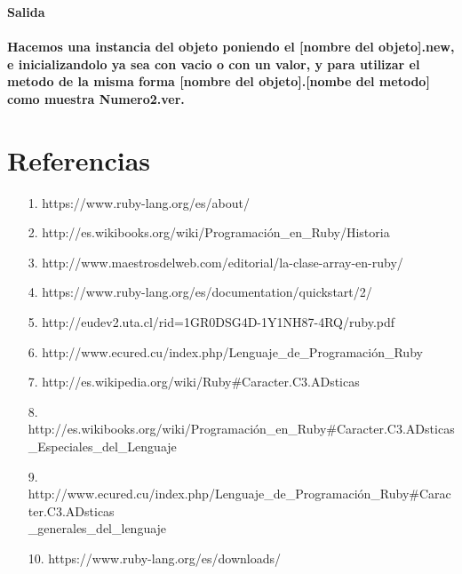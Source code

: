 \documentclass[11pt]{article} %
\begin{document}
\begin{itemize}
\bf Salida\\\\
Hacemos una instancia del objeto poniendo el [nombre del objeto].new, e inicializandolo ya sea con vacio o con un valor, y para utilizar el metodo de la misma forma [nombre del objeto].[nombe del metodo] como muestra Numero2.ver.\\


\end{itemize}

\newpage
\section{\fontsize{14}{0} \bf Referencias}
\begin{itemize}
          \item [1.] https://www.ruby-lang.org/es/about/ \\
          \item [2.] http://es.wikibooks.org/wiki/Programación\_en\_Ruby/Historia\\
	\item[3.]  http://www.maestrosdelweb.com/editorial/la-clase-array-en-ruby/\\
	\item[4.] https://www.ruby-lang.org/es/documentation/quickstart/2/\\
	\item[5.] http://eudev2.uta.cl/rid=1GR0DSG4D-1Y1NH87-4RQ/ruby.pdf\\
	\item[6.] http://www.ecured.cu/index.php/Lenguaje\_de\_Programación\_Ruby\\
	\item[7.]  http://es.wikipedia.org/wiki/Ruby\#Caracter.C3.ADsticas \\
	\item[8.]  http://es.wikibooks.org/wiki/Programación\_en\_Ruby\#Caracter.C3.ADsticas\\
\_Especiales\_del\_Lenguaje \\
	 \item[9.] http://www.ecured.cu/index.php/Lenguaje\_de\_Programación\_Ruby\#Caracter.C3.ADsticas\\
\_generales\_del\_lenguaje \\
	\item[10.] https://www.ruby-lang.org/es/downloads/

\end{itemize}
\end{document}
